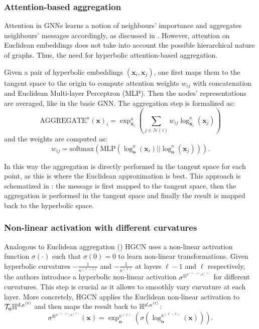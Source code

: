 \subsubsection{Attention-based aggregation}
Attention in GNNs learns a notion of neighbours' importance and aggregates neighbours' messages accordingly, as discussed in . However, attention on Euclidean embeddings does not take into account the possible hierarchical nature of graphs. Thus, the need for hyperbolic attention-based aggregation. 

Given a pair of hyperbolic embeddings $(\mathbf{x}_i, \mathbf{x}_j)$, one first maps them to the tangent space to the origin to compute attention weights $w_{ij}$ with concatenation and Euclidean Multi-layer Perceptron (MLP). Then the nodes' representations are averaged, like in the basic GNN. The aggregation step is formalized as:
\begin{equation*}
    \text{AGGREGATE}^\kappa(\mathbf{x})_i = \exp_{\mathbf{x}_i}^\kappa\left(\sum_{j\in\mathcal{N}(i)}w_{ij}\log_{\mathbf{x}_i}^\kappa\left(\mathbf{x}_j\right)\right)
\end{equation*}
and the weights are computed as:
\begin{equation*}
    w_{ij} = \text{softmax}\left(\text{MLP}\left(\log_{\mathbf{o}}^\kappa(\mathbf{x}_i) \left|\right| \log_{\mathbf{o}}^\kappa\left(\mathbf{x}_j\right)\right)\right).
\end{equation*}

In this way the aggregation is directly performed in the tangent space for each point, as this is where the Euclidean approximation is best. This approach is schematized in : the message is first mapped to the tangent space, then the aggregation is performed in the tangent space and finally the result is mapped back to the hyperbolic space.



\subsubsection{Non-linear activation with different curvatures}
Analogous to Euclidean aggregation () HGCN uses a non-linear activation function $\sigma(\cdot)$ such that $\sigma(0)=0$ to learn non-linear transformations. Given hyperbolic curvatures $-\frac{1}{\kappa^{(\ell-1)}}$ and $-\frac{1}{\kappa^{(\ell)}}$ at layers $\ell-1$ and $\ell$ respectively, the authors introduce a hyperbolic non-linear activation $\sigma^{\otimes^{\kappa^{(\ell-1)}, \kappa^{(\ell)}}}$ for different curvatures. This step is crucial as it allows to smoothly vary curvature at each layer. More concretely, HGCN applies the Euclidean non-linear activation to $\mathcal{T}_\mathbf{o}\mathbb{H}^{d,\kappa^{(\ell)}}$ and then maps the result back to $\mathbb{H}^{d,\kappa^{(\ell)}}$:
\begin{equation*}
    \sigma^{\otimes^{\kappa^{(\ell-1)}, \kappa^{(\ell)}}}(\mathbf{x}) = \exp_{\mathbf{o}}^{\kappa^{(\ell)}}\left(\sigma\left(\log_{\mathbf{o}}^{\kappa^{(\ell-1)}}(\mathbf{x})\right)\right).
\end{equation*}


